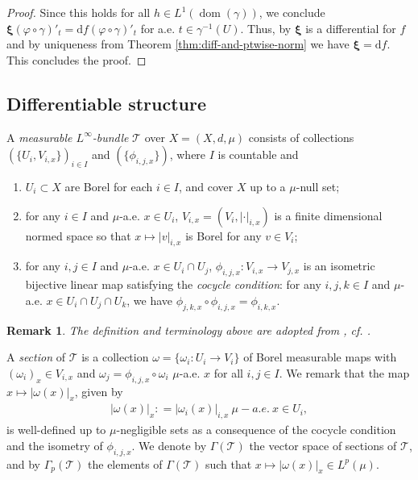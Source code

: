 \documentclass{amsart}
\newtheorem{remark}[theorem]{Remark}
\numberwithin{equation}{section}
\newcommand{\dom}{\operatorname{dom}}
\newcommand{\ud}{\mathrm {d}}
\newcommand{\inv}{^{-1}}
\newcommand{\defl}{\mathrel{\mathop:}=}
\begin{document}
\begin{proof}
    Since this holds for all $h\in L^1(\dom(\gamma))$, we conclude $\bm \xi(\varphi \circ \gamma)'_t=\ud f(\varphi \circ \gamma)'_t$ for a.e. $t\in \gamma\inv(U)$. Thus, by $\bm\xi$ is a differential for $f$ and by uniqueness from Theorem \ref{thm:diff-and-ptwise-norm} we have $\bm\xi=\ud f$. This concludes the proof.
\end{proof}

\subsection{Differentiable structure}\label{sec:diff-str} A \emph{measurable $L^\infty$-bundle} $\mathcal{T}$ over $X=(X,d,\mu)$ consists of collections $(\{U_i,V_{i,x}\})_{i\in I}$ and $(\{\phi_{i,j,x}\} )$, where $I$ is countable and
\begin{enumerate}
	\item $U_i\subset X$ are Borel for each $i\in I$, and cover $X$ up to a $\mu$-null set;
	\item for any $i\in I$ and $\mu$-a.e. $x\in U_i$, $V_{i,x}=(V_i,|\cdot|_{i,x})$ is a finite dimensional normed space so that $x\mapsto |v|_{i,x}$ is Borel for any $v\in V_i$;
	\item for any $i,j\in I$ and $\mu$-a.e. $x\in U_i\cap U_j$, $\phi_{i,j,x}\colon V_{i,x} \to V_{j,x}$ is an isometric bijective linear map satisfying the \emph{cocycle condition}: for any $i,j,k \in I$ and $\mu$-a.e. $x \in U_i \cap U_j \cap U_k$, we have $\phi_{j,k,x} \circ \phi_{i,j,x}=\phi_{i,k,x}$.
\end{enumerate}

\begin{remark}
The definition and terminology above are adopted from \cite{che99}, cf. \cite[Section 4]{che99}.
\end{remark}

A \emph{section} of $\mathcal T$ is a collection $\omega=\{\omega_i:U_i\to V_i \}$ of Borel measurable maps with $(\omega_i)_x\in V_{i,x}$ and $\omega_j=\phi_{i,j,x}\circ\omega_i$ $\mu$-a.e. $x$ for all $i,j\in I$. %
We remark that the map $x\mapsto |\omega(x)|_{x}$, given by 
\begin{align}\label{eq:norm-of-section}
|\omega(x)|_x\defl |\omega_i(x)|_{i,x}\ \mu-a.e. \ x\in U_i,
\end{align}
is well-defined up to $\mu$-negligible sets as a consequence of the cocycle condition and the isometry of $\phi_{i,j,x}$. We denote by $\Gamma(\mathcal T)$ the vector space of sections of $\mathcal T$, and by $\Gamma_p(\mathcal T)$ the elements of $\Gamma(\mathcal T)$  such that $x\mapsto |\omega(x)|_x\in L^p(\mu)$. 
\end{document}
